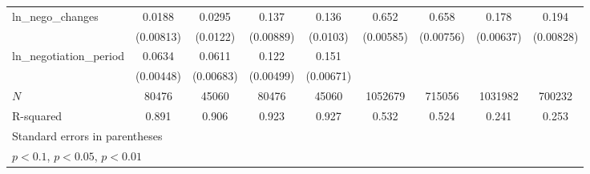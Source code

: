 {\begin{adjustbox}{max width=\textwidth}
\begin{tabular}{l*{8}{c}}
\addlinespace
ln\_nego\_changes&      0.0188\sym{**} &      0.0295\sym{**} &       0.137\sym{***}&       0.136\sym{***}&       0.652\sym{***}&       0.658\sym{***}&       0.178\sym{***}&       0.194\sym{***}\\
            &   (0.00813)         &    (0.0122)         &   (0.00889)         &    (0.0103)         &   (0.00585)         &   (0.00756)         &   (0.00637)         &   (0.00828)         \\
\addlinespace
ln\_negotiation\_period&      0.0634\sym{***}&      0.0611\sym{***}&       0.122\sym{***}&       0.151\sym{***}&                     &                     &                     &                     \\
            &   (0.00448)         &   (0.00683)         &   (0.00499)         &   (0.00671)         &                     &                     &                     &                     \\
\midrule
\(N\)       &       80476         &       45060         &       80476         &       45060         &     1052679         &      715056         &     1031982         &      700232         \\
R-squared   &       0.891         &       0.906         &       0.923         &       0.927         &       0.532         &       0.524         &       0.241         &       0.253         \\
\bottomrule
\multicolumn{9}{l}{\footnotesize Standard errors in parentheses}\\
\multicolumn{9}{l}{\footnotesize \sym{*} \(p<0.1\), \sym{**} \(p<0.05\), \sym{***} \(p<0.01\)}\\
\end{tabular}
\end{adjustbox}
}
